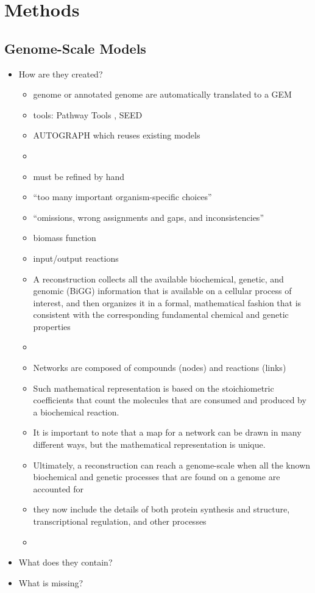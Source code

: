 \section{Methods}\label{sec:methods}

\subsection{Genome-Scale Models}\label{ssec:genome_scale_models}

\begin{itemize}
 \item How are they created?
 \begin{itemize}
  \item genome or annotated genome are automatically translated to a GEM
  \item tools: Pathway Tools \cite{karp2009pathway}, SEED \cite{henry2010high}
  \item AUTOGRAPH \cite{notebaart2006accelerating} which reuses existing models
  \item \cite{santos_practical_2011}
  \item must be refined by hand
  \item ``too many important organism-specific choices''
  \item ``omissions, wrong assignments and gaps, and inconsistencies''
  \item biomass function
  \item input/output reactions
  \item A reconstruction collects all the available
biochemical, genetic, and genomic (BiGG) information that is available on a cellular
process of interest, and then organizes it in a formal, mathematical fashion that is
consistent with the corresponding fundamental chemical and genetic properties
  \item \cite{palsson2015systems}
  \item Networks are composed of compounds (nodes) and reactions (links)
  \item Such mathematical
representation is based on the stoichiometric coefficients that count the molecules that
are consumed and produced by a biochemical reaction.
  \item It is important to note that a map for a network can be drawn in many
different ways, but the mathematical representation is unique.
  \item Ultimately, a reconstruction can reach a genome-scale when all the known
biochemical and genetic processes that are found on a genome are accounted for
  \item they now include the details of both protein
synthesis and structure, transcriptional regulation, and other processes
  \item 
 \end{itemize}

 \item What does they contain?
 \item What is missing?
\end{itemize}


